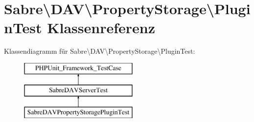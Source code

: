 \hypertarget{class_sabre_1_1_d_a_v_1_1_property_storage_1_1_plugin_test}{}\section{Sabre\textbackslash{}D\+AV\textbackslash{}Property\+Storage\textbackslash{}Plugin\+Test Klassenreferenz}
\label{class_sabre_1_1_d_a_v_1_1_property_storage_1_1_plugin_test}
Klassendiagramm für Sabre\textbackslash{}D\+AV\textbackslash{}Property\+Storage\textbackslash{}Plugin\+Test\+:\begin{figure}[H]
\begin{center}
\leavevmode
\includegraphics[height=3.000000cm]{class_sabre_1_1_d_a_v_1_1_property_storage_1_1_plugin_test}
\end{center}
\end{figure}
